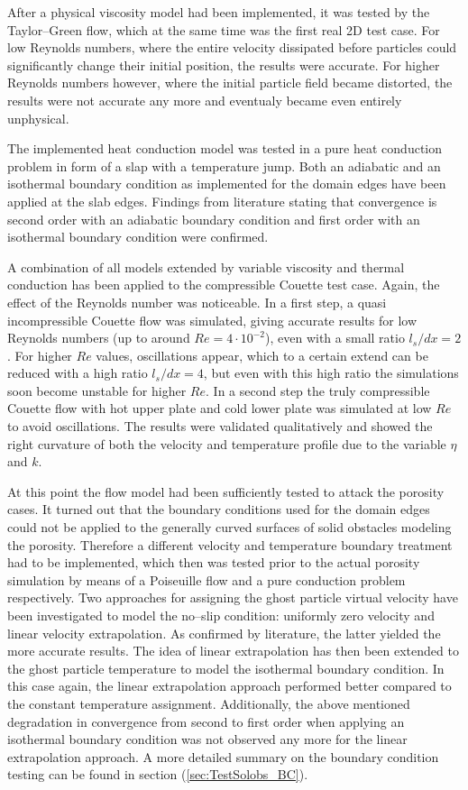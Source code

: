 \documentclass[11pt,a4paper,twoside]{report}
\begin{document}
After a physical viscosity model had been implemented, it was tested by the Taylor--Green flow, which at the same time was the first real 2D %
test case. For low Reynolds numbers, where the entire velocity dissipated before particles could significantly change their initial position, the results were accurate. For higher Reynolds numbers however, where the initial particle field became distorted, the results were not accurate any more and eventualy became even entirely unphysical.

The implemented heat conduction model was tested in a pure heat conduction problem in form of a slap with a temperature jump. Both an adiabatic and an isothermal boundary condition as implemented for the domain edges have been applied at the slab edges.
Findings from literature stating that convergence is second order with an adiabatic boundary condition and first order with an isothermal boundary condition were confirmed.

A combination of all models extended by variable viscosity and thermal conduction has been applied to the compressible Couette test case. Again, the effect of the Reynolds number was noticeable. In a first step, a quasi incompressible Couette flow was simulated, giving accurate results for low Reynolds numbers (up to around $Re=4\cdot10^{-2}$), even with a small ratio $l_s/dx=2$. For higher $Re$ values, oscillations appear, which to a certain extend can be reduced with a high ratio $l_s/dx=4$, but even with this high ratio the simulations soon become unstable for higher $Re$. In a second step the truly compressible Couette flow with hot upper plate and cold lower plate was simulated at low $Re$ to avoid oscillations. The results were validated qualitatively and showed the right curvature of both the velocity and temperature profile due to the variable $\eta$ and $k$.

At this point the flow model had been sufficiently tested to attack the porosity cases. It turned out that the boundary conditions used for the domain edges could not be applied to the generally curved surfaces of solid obstacles modeling the porosity. Therefore a different velocity and temperature boundary treatment had to be implemented,  which then was tested prior to the actual porosity simulation by means of a Poiseuille flow and a pure conduction problem respectively. Two approaches for assigning the ghost particle virtual velocity have been investigated to model the no--slip condition: uniformly zero velocity and linear velocity extrapolation. As confirmed by literature, the latter yielded the more accurate results. The idea of linear extrapolation has then been extended to the ghost particle temperature to model the isothermal boundary condition. In this case again, the linear extrapolation approach performed better compared to the constant temperature assignment. Additionally, the above mentioned degradation in convergence from second to first order when applying an isothermal boundary condition was not observed any more for the linear extrapolation approach. A more detailed summary on the boundary condition testing can be found in section (\ref{sec:TestSolobs_BC}).
\end{document}
